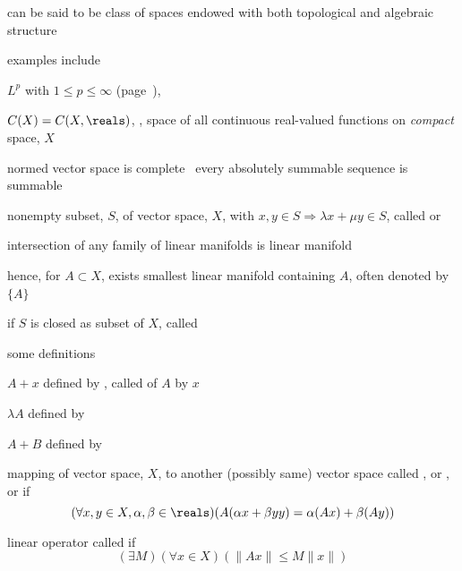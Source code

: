 \documentclass[17pt,landscape]{foils}
\begin{document}
{{	\bit
		\item can be said to be class of spaces endowed with
			both topological and algebraic structure
	\eit

	\vitem examples include

	\bit
		\item $L^p$ with $1\leq p\leq \infty$ (page~\pageref{page:Banach-space}),
		\item $C(X)=C(X,\reals)$, \ie, space of all continuous real-valued functions on \emph{compact} space, $X$\
	\eit
\eit



\bit
	\item normed vector space is complete \iaoi\ every absolutely summable sequence is summable
\eit



\bit
	\item nonempty subset, $S$, of vector space, $X$,
		with $x,y\in S\Rightarrow \lambda x + \mu y\in S$,
		called  or 

	\vitem intersection of any family of linear manifolds is linear manifold

	\vitem hence, for $A\subset X$,
		exists smallest linear manifold containing $A$,
		often denoted by $\{A\}$\

	\vvitem if $S$ is closed as subset of $X$, called 

	\vvitem some definitions

	\bit
		\item $A+x$ defined by , called  of $A$ by $x$
		\item $\lambda A$ defined by \set{\lambda x}{x \in A}\
		\item $A+B$ defined by \
	\eit
\eit



\bit
	\item mapping of vector space, $X$, to another (possibly same) vector space
		called
		,
		or
		,
		or
		if
		\[
			(\forall x,y \in X, \alpha, \beta \in \reals)
			(A(\alpha x + \beta y y) = \alpha (Ax) + \beta (Ay))
		\]

	\vitem linear operator called 
		if
		\[
			(\exists M)
			(\forall x \in X)
			(\|Ax\|\leq M \|x\|)
		\]

}}
\end{document}
